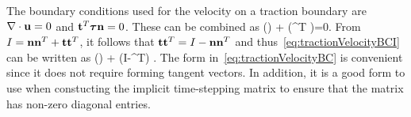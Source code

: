 The boundary conditions used for the velocity on a traction boundary are $\nabla\cdot\mathbf{ u}=0$ and $\mathbf{ t}^T\boldsymbol{\tau}\mathbf{ n}=0$. These can be combined as
\ba
     (\grad\cdot\uv) \nv + \tv (\tv^T \tauv\nv)=0. \label{eq:tractionVelocityBCI}
\ea
From $I= \mathbf{ n}\mathbf{ n}^T + \mathbf{ t}\mathbf{ t}^T$, it follows that $\mathbf{ t}\mathbf{ t}^T = I - \mathbf{ n}\mathbf{ n}^T$ and thus~\eqref{eq:tractionVelocityBCI} can be written as 
\ba
     (\grad\cdot\uv) \nv + (I-\nv\nv^T) \tauv{} . \label{eq:tractionVelocityBC}
\ea
The form in~\eqref{eq:tractionVelocityBC} is convenient since it does not require forming tangent vectors. In addition, it is a good form to use when constucting 
the implicit time-stepping matrix to ensure that the matrix has non-zero diagonal entries.













